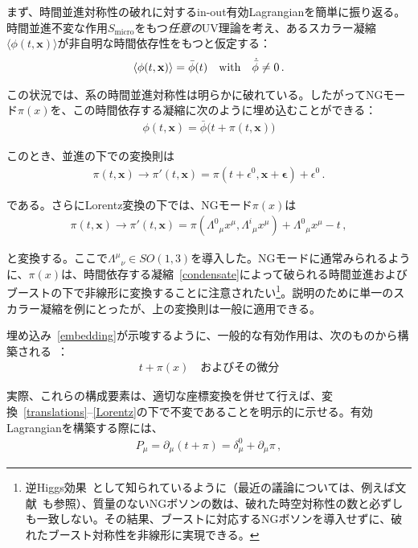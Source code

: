 まず、時間並進対称性の破れに対するin-out有効Lagrangianを簡単に振り返る。時間並進不変な作用$S_{\mathrm{micro}}$をもつ\textit{任意の}UV理論を考え、あるスカラー凝縮$\langle\phi(t,\mathbf{x})\rangle$が非自明な時間依存性をもつと仮定する：
\begin{align}
\label{condensate}
 \langle\phi(t,\mathbf{x})\rangle
 = \bar{\phi}(t)
\quad
{\rm with}
\quad
\dot{\bar{\phi}}\neq0
\,.
\end{align}

この状況では、系の時間並進対称性は明らかに破れている。したがってNGモード$\pi(x)$を、この時間依存する凝縮に次のように埋め込むことができる：
\begin{align}
\label{embedding}
\phi(t,\mathbf{x})=\bar{\phi} \big(t+\pi(t,\mathbf{x}) \big)
\end{align}

このとき、並進の下での変換則は
\begin{align}
 \label{translations}
 \pi(t,\mathbf{x})
 \to \pi'(t,\mathbf{x})
 = \pi(t+\epsilon^0,\mathbf{x}+\boldsymbol{\epsilon})+\epsilon^0\,.
\end{align}

である。さらにLorentz変換の下では、NGモード$\pi(x)$は
\begin{align}
 \label{Lorentz}
 \pi(t,\mathbf{x})
 \to \pi' (t,\mathbf{x}) 
 = \pi \left(\Lambda^0{}_\mu x^\mu,\Lambda^i{}_\mu x^\mu\right)+\Lambda^0{}_\mu x^\mu-t
\,,
\end{align}

と変換する。ここで$\Lambda^\mu{}_\nu\in SO(1,3)$を導入した。NGモードに通常みられるように、$\pi(x)$は、時間依存する凝縮~\eqref{condensate}によって破られる時間並進およびブーストの下で非線形に変換することに注意されたい\footnote{逆Higgs効果~\cite{Ivanov:1975zq}として知られているように（最近の議論については、例えば文献~\cite{Nicolis:2013sga,Endlich:2013vfa,Brauner:2014aha,Hidaka:2014fra}も参照）、質量のないNGボソンの数は、破れた時空対称性の数と必ずしも一致しない。その結果、ブーストに対応するNGボソンを導入せずに、破れたブースト対称性を非線形に実現できる。}。説明のために単一のスカラー凝縮を例にとったが、上の変換則は一般に適用できる。

\medskip
埋め込み~\eqref{embedding}が示唆するように、一般的な有効作用は、次のものから構築される~\cite{Cheung:2007st}：
\begin{align}
 t + \pi(x)
\quad
\text{およびその微分}
\end{align}

実際、これらの構成要素は、適切な座標変換を併せて行えば、変換~\eqref{translations}--\eqref{Lorentz}の下で不変であることを明示的に示せる。有効Lagrangianを構築する際には、
\begin{align}
P_\mu=\partial_\mu(t+\pi)=\delta^0_\mu+\partial_\mu\pi\,,
\label{notation:P}
\end{align}

